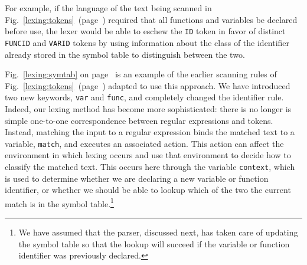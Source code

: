 For example, if the language of the text being scanned in Fig.~\ref{lexing:tokens}~(page~\pageref{lexing:tokens}) required that all functions and variables be declared before use, the lexer would be able to eschew the \lstinline[language=flex]{ID} token in favor of distinct \lstinline[language=flex]{FUNCID} and \lstinline[language=flex]{VARID} tokens by using information about the class of the identifier already stored in the symbol table to distinguish between the two.

Fig.~\ref{lexing:symtab} on page~\pageref{lexing:symtab} is an example of the earlier scanning rules of Fig.~\ref{lexing:tokens}~(page~\pageref{lexing:tokens}) adapted to use this approach. We have introduced two new keywords, \lstinline[morekeywords=var]{var} and \lstinline[morekeywords=func]{func}, and completely changed the identifier rule. Indeed, our lexing method has become more sophisticated: there is no longer is simple one-to-one correspondence between regular expressions and tokens. Instead, matching the input to a regular expression binds the matched text to a variable, \lstinline[language=CAML]{match}, and executes an associated action. This action can affect the environment in which lexing occurs and use that environment to decide how to classify the matched text. This occurs here through the variable \lstinline{context}, which is used to determine whether we are declaring a new variable or function identifier, or whether we should be able to lookup which of the two the current match is in the symbol table.\footnote{We have assumed that the parser, discussed next, has taken care of updating the symbol table so that the lookup will succeed if the variable or function identifier was previously declared.}

